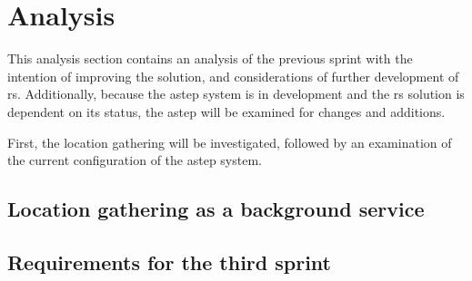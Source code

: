 \section{Analysis}
This analysis section contains an analysis of the previous sprint with the intention of improving the solution, and considerations of further development of \gls{rs}.
Additionally, because the \gls{astep} system is in development and the \gls{rs} solution is dependent on its status, the \gls{astep} will be examined for changes and additions.

First, the location gathering will be investigated, followed by an examination of the current configuration of the \gls{astep} system.

\subsection{Location gathering as a background service} \label{ssec:LocationGatherBGS}






\subsection{Requirements for the third sprint}
